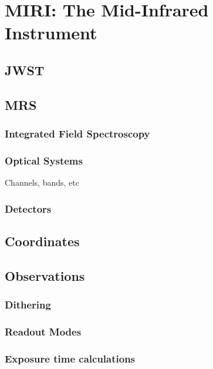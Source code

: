 \chapter{MIRI: The Mid-Infrared Instrument}
\section{JWST}
\section{MRS}\label{sec:mrs}
\subsection{Integrated Field Spectroscopy}
\subsection{Optical Systems}
Channels, bands, etc \cite{ref:Chen2019}
\subsection{Detectors}
\section{Coordinates}
\section{Observations}
\subsection{Dithering}
\subsection{Readout Modes}
\subsection{Exposure time calculations}
